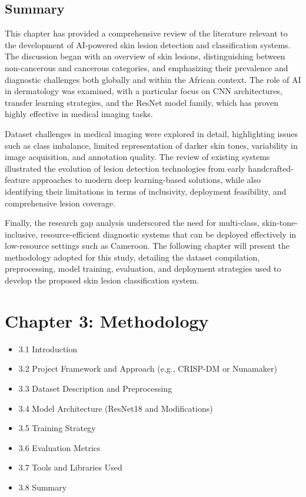 \documentclass[
  12pt,
  oneside]{article}
\providecommand{\tightlist}{%
  \setlength{\itemsep}{0pt}\setlength{\parskip}{0pt}}
\begin{document}
\subsection{Summary}\label{summary}

This chapter has provided a comprehensive review of the literature
relevant to the development of AI-powered skin lesion detection and
classification systems. The discussion began with an overview of skin
lesions, distinguishing between non-cancerous and cancerous categories,
and emphasizing their prevalence and diagnostic challenges both globally
and within the African context. The role of AI in dermatology was
examined, with a particular focus on CNN architectures, transfer
learning strategies, and the ResNet model family, which has proven
highly effective in medical imaging tasks.

Dataset challenges in medical imaging were explored in detail,
highlighting issues such as class imbalance, limited representation of
darker skin tones, variability in image acquisition, and annotation
quality. The review of existing systems illustrated the evolution of
lesion detection technologies from early handcrafted-feature approaches
to modern deep learning-based solutions, while also identifying their
limitations in terms of inclusivity, deployment feasibility, and
comprehensive lesion coverage.

Finally, the research gap analysis underscored the need for multi-class,
skin-tone-inclusive, resource-efficient diagnostic systems that can be
deployed effectively in low-resource settings such as Cameroon. The
following chapter will present the methodology adopted for this study,
detailing the dataset compilation, preprocessing, model training,
evaluation, and deployment strategies used to develop the proposed skin
lesion classification system.

\newpage

\section{Chapter 3: Methodology}\label{chapter-3-methodology}

\begin{itemize}
\tightlist
\item
  3.1 Introduction
\item
  3.2 Project Framework and Approach (e.g., CRISP-DM or Nunamaker)
\item
  3.3 Dataset Description and Preprocessing
\item
  3.4 Model Architecture (ResNet18 and Modifications)
\item
  3.5 Training Strategy
\item
  3.6 Evaluation Metrics
\item
  3.7 Tools and Libraries Used
\item
  3.8 Summary
\end{itemize}
\end{document}

